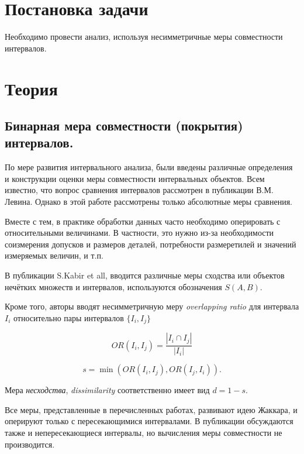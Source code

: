 \documentclass[a4paper,12pt]{article}
\begin{document}
    
    \newpage

    \tableofcontents
    \listoffigures
    \newpage

    \section{Постановка задачи}
    \quad Необходимо провести анализ, используя несимметричные меры совместности интервалов.

    \section{Теория}
    \subsection{Бинарная мера совместности (покрытия) интервалов.}

    По мере развития интервального анализа, были введены различные
    определения и конструкции оценки меры совместности интервальных
    объектов. Всем известно, что вопрос сравнения интервалов рассмотрен
    в публикации В.М. Левина. Однако в этой работе рассмотрены
    только абсолютные меры сравнения.

    Вместе с тем, в практике обработки данных часто необходимо
    оперировать с относительными величинами.
    В частности, это нужно из-за необходимости соизмерения допусков и размеров деталей, потребности размеретилей и значений измеряемых величин, и т.п.

    В публикации S.Kabir et all, вводится различные меры сходства
    или объектов нечётких множеств и интервалов, используются обозначения $S(A, B)$.

    Кроме того, авторы вводят несимметричную меру \textit{overlapping ratio}
    для интервала $I_i$ относительно пары интервалов $\{I_i, I_j\}$

    \begin{equation}
    OR(I_i, I_j) = \frac{|I_i \cap I_j|}{|I_i|}\label{eq:equation1}
    \end{equation}

    \begin{equation}
    s = \min(OR(I_i, I_j), OR(I_j, I_i)).
    \end{equation}

    Мера \textit{несходства}, \textit{dissimilarity} соответственно имеет вид $d = 1 - s$.

    Все меры, представленные в перечисленных работах, развивают
    идею Жаккара, и оперируют только с пересекающимися интервалами.
    В публикации обсуждаются также и непересекающиеся интервалы,
    но вычисления меры совместности не производится.
\end{document}
